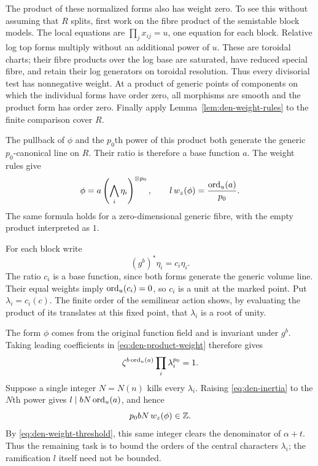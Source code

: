 The product of these normalized forms also has weight zero.  To see
this without assuming that $R$ splits, first work on the fibre
product of the semistable block models.  The local equations are
$\prod_jx_{ij}=u$, one equation for each block.  Relative log top
forms multiply without an additional power of $u$.  These are
toroidal charts; their fibre products over the log base are
saturated, have reduced special fibre, and retain their log
generators on toroidal resolution.  Thus every divisorial test has
nonnegative weight.  At a product of generic points of components
on which the individual forms have order zero, all morphisms are
smooth and the product form has order zero.  Finally apply
Lemma~\ref{lem:den-weight-rules} to the finite comparison cover $R$.

The pullback of $\phi$ and the $p_0$th power of this product both
generate the generic $p_0$-canonical line on $R$. Their ratio is
therefore a base function $a$. The weight rules give
\begin{equation}\label{eq:den-product-weight}
 \phi=a\left(\bigwedge_i\eta_i\right)^{\otimes p_0},
 \qquad l\,w_z(\phi)=\frac{\operatorname{ord}_u(a)}{p_0}.
\end{equation}
The same formula holds for a zero-dimensional generic fibre, with
the empty product interpreted as $1$.

For each block write
\[
 (g^b)^*\eta_i=c_i\eta_i.
\]
The ratio $c_i$ is a base function, since both forms generate the
generic volume line. Their equal weights imply $\operatorname{ord}_u(c_i)=0$,
so $c_i$ is a unit at the marked point. Put $\lambda_i=c_i(c)$.
The finite order of the semilinear action shows, by evaluating the
product of its translates at this fixed point, that $\lambda_i$ is
a root of unity.

The form $\phi$ comes from the original function field and is
invariant under $g^b$. Taking leading coefficients in
\eqref{eq:den-product-weight} therefore gives
\begin{equation}\label{eq:den-inertia}
 \zeta^{b\operatorname{ord}_u(a)}\prod_i\lambda_i^{p_0}=1.
\end{equation}
Suppose a single integer $N=N(n)$ kills every $\lambda_i$. Raising
\eqref{eq:den-inertia} to the $N$th power gives
$l\mid bN\operatorname{ord}_u(a)$, and hence
\[
 p_0bN\,w_z(\phi)\in\mathbb Z.
\]
By \eqref{eq:den-weight-threshold}, this same integer clears the
denominator of $\alpha+t$. Thus the
remaining task is to bound the orders of the central characters
$\lambda_i$; the ramification $l$ itself need not be bounded.

